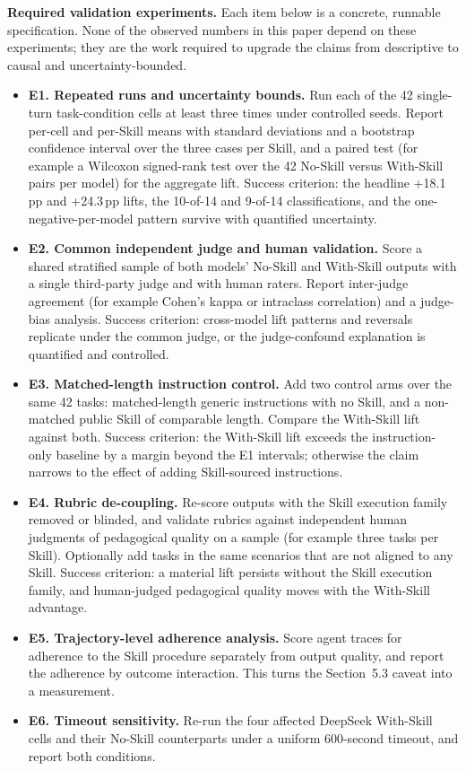 \documentclass[10pt]{article}
\newcommand{\ppgain}[1]{+#1\,pp}
\begin{document}
\textbf{Required validation experiments.}
Each item below is a concrete, runnable specification. None of the observed numbers in this paper depend on these experiments; they are the work required to upgrade the claims from descriptive to causal and uncertainty-bounded.

\begin{itemize}
  \item \textbf{E1. Repeated runs and uncertainty bounds.} Run each of the 42 single-turn task-condition cells at least three times under controlled seeds. Report per-cell and per-Skill means with standard deviations and a bootstrap confidence interval over the three cases per Skill, and a paired test (for example a Wilcoxon signed-rank test over the 42 No-Skill versus With-Skill pairs per model) for the aggregate lift. Success criterion: the headline \ppgain{18.1} and \ppgain{24.3} lifts, the 10-of-14 and 9-of-14 classifications, and the one-negative-per-model pattern survive with quantified uncertainty.
  \item \textbf{E2. Common independent judge and human validation.} Score a shared stratified sample of both models' No-Skill and With-Skill outputs with a single third-party judge and with human raters. Report inter-judge agreement (for example Cohen's kappa or intraclass correlation) and a judge-bias analysis. Success criterion: cross-model lift patterns and reversals replicate under the common judge, or the judge-confound explanation is quantified and controlled.
  \item \textbf{E3. Matched-length instruction control.} Add two control arms over the same 42 tasks: matched-length generic instructions with no Skill, and a non-matched public Skill of comparable length. Compare the With-Skill lift against both. Success criterion: the With-Skill lift exceeds the instruction-only baseline by a margin beyond the E1 intervals; otherwise the claim narrows to the effect of adding Skill-sourced instructions.
  \item \textbf{E4. Rubric de-coupling.} Re-score outputs with the Skill execution family removed or blinded, and validate rubrics against independent human judgments of pedagogical quality on a sample (for example three tasks per Skill). Optionally add tasks in the same scenarios that are not aligned to any Skill. Success criterion: a material lift persists without the Skill execution family, and human-judged pedagogical quality moves with the With-Skill advantage.
  \item \textbf{E5. Trajectory-level adherence analysis.} Score agent traces for adherence to the Skill procedure separately from output quality, and report the adherence by outcome interaction. This turns the Section~5.3 caveat into a measurement.
  \item \textbf{E6. Timeout sensitivity.} Re-run the four affected DeepSeek With-Skill cells and their No-Skill counterparts under a uniform 600-second timeout, and report both conditions.
\end{itemize}
\end{document}
